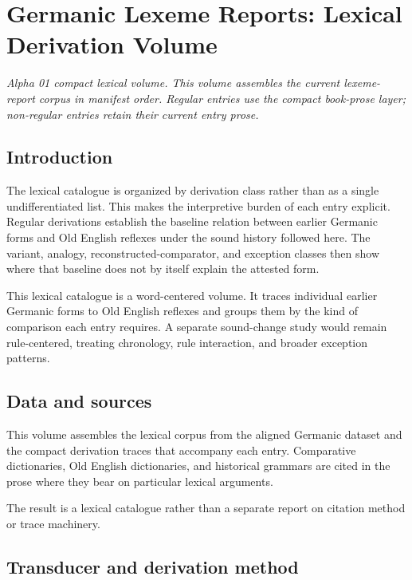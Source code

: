 \documentclass[
  british,
  a4paper,
]{article}
\author{}
\date{}
\begin{document}
\section{Germanic Lexeme Reports: Lexical Derivation
Volume}\label{germanic-lexeme-reports-lexical-derivation-volume}

\emph{Alpha 01 compact lexical volume. This volume assembles the current
lexeme-report corpus in manifest order. Regular entries use the compact
book-prose layer; non-regular entries retain their current entry prose.}

\subsection{Introduction}\label{introduction}

The lexical catalogue is organized by derivation class rather than as a
single undifferentiated list. This makes the interpretive burden of each
entry explicit. Regular derivations establish the baseline relation
between earlier Germanic forms and Old English reflexes under the sound
history followed here. The variant, analogy, reconstructed-comparator,
and exception classes then show where that baseline does not by itself
explain the attested form.

This lexical catalogue is a word-centered volume. It traces individual
earlier Germanic forms to Old English reflexes and groups them by the
kind of comparison each entry requires. A separate sound-change study
would remain rule-centered, treating chronology, rule interaction, and
broader exception patterns.

\subsection{Data and sources}\label{data-and-sources}

This volume assembles the lexical corpus from the aligned Germanic
dataset and the compact derivation traces that accompany each entry.
Comparative dictionaries, Old English dictionaries, and historical
grammars are cited in the prose where they bear on particular lexical
arguments.

The result is a lexical catalogue rather than a separate report on
citation method or trace machinery.

\subsection{Transducer and derivation
method}\label{transducer-and-derivation-method}
\end{document}
